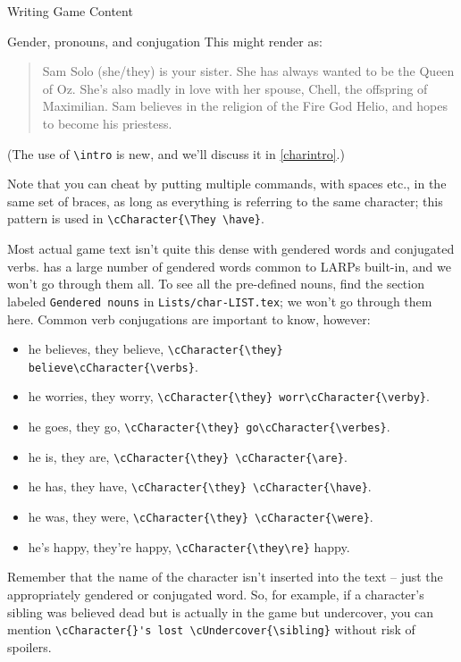 \documentclass[sheet]{GameTexBase}
\newcommand{\pronounfile}{\lstinline|Lists/char-LIST.tex|}
\begin{document}
\begin{section}{Writing Game Content}
\begin{subsection}{Gender, pronouns, and conjugation}
This might render as:

\begin{quote}
Sam Solo (she/they) is your sister.  She has always wanted to be the Queen of Oz.  She's also madly in love with her spouse, Chell, the offspring of Maximilian.  Sam believes in the religion of the Fire God Helio, and hopes to become his priestess.
\end{quote}

(The use of \lstinline|\intro| is new, and we'll discuss it in \ref{charintro}.)

Note that you can cheat by putting multiple commands, with spaces etc., in the same set of braces, as long as everything is referring to the same character; this pattern is used in \lstinline|\cCharacter{\They \have}|.

Most actual game text isn't quite this dense with gendered words and conjugated verbs.  \gametex{} has a large number of gendered words common to LARPs built-in, and we won't go through them all.
To see all the pre-defined nouns, find the section labeled \texttt{Gendered nouns} in \pronounfile{}; we won't go through them here.  Common verb conjugations are important to know, however:

\begin{itemize}
\item he believes, they believe, \lstinline|\cCharacter{\they} believe\cCharacter{\verbs}|.
\item he worries, they worry, \lstinline|\cCharacter{\they} worr\cCharacter{\verby}|.
\item he goes, they go, \lstinline|\cCharacter{\they} go\cCharacter{\verbes}|.
\item he is, they are, \lstinline|\cCharacter{\they} \cCharacter{\are}|.
\item he has, they have, \lstinline|\cCharacter{\they} \cCharacter{\have}|.
\item he was, they were, \lstinline|\cCharacter{\they} \cCharacter{\were}|.
\item he's happy, they're happy, \lstinline|\cCharacter{\they\re}| happy.
\end{itemize}

Remember that the name of the character isn't inserted into the text – just the appropriately gendered or conjugated word.  So, for example, if a character's sibling was believed dead but is actually in the game but undercover, you can mention \lstinline|\cCharacter{}'s lost \cUndercover{\sibling}| without risk of spoilers.


\end{subsection}
\end{section}
\end{document}
